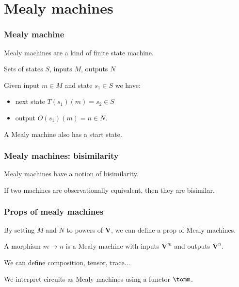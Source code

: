 \section{Mealy machines}

\begin{frame}
    \frametitle{Mealy machine}

    Mealy machines are a kind of \alert{finite state machine}.

    \pause

    Sets of \alert{states} $S$, \pause \alert{inputs} $M$, \pause \alert{outputs} $N$

    \pause

    Given input $m \in M$ and state $s_1 \in S$ we have:
    
    \pause

    \begin{itemize}
        \item \alert{next state} $T(s_1)(m) = s_2 \in S$
        \pause
        \item \alert{output} $O(s_1)(m) = n \in N$.
    \end{itemize}

    \pause

    A Mealy machine also has a \alert{start state}.

    \pause

    \begin{center}
        
    \end{center}

\end{frame}

\begin{frame}
    \frametitle{Mealy machines: bisimilarity}

    Mealy machines have a notion of \alert{bisimilarity}.

    \pause

    If two machines are \alert{observationally equivalent}, then they are bisimilar.

\end{frame}

\begin{frame}
    \frametitle{Props of mealy machines}

    By setting $M$ and $N$ to powers of $\textbf{V}$, we can define a prop of Mealy machines.

    \pause

    A morphism $m \to n$ is a Mealy machine with inputs $\textbf{V}^m$ and outputs $\textbf{V}^n$.
    
    \pause

    We can define composition, tensor, trace...

    \pause

    We interpret circuits as Mealy machines using a functor $\tomm$.

\end{frame}

